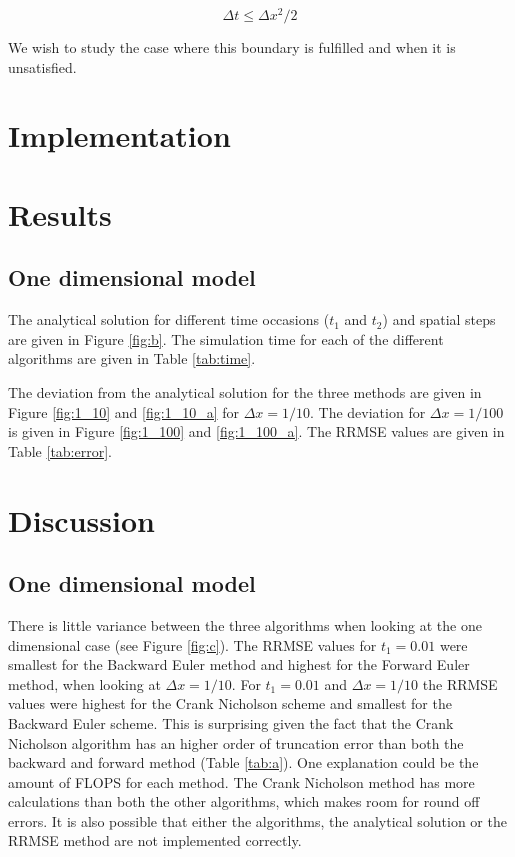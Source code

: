 \documentclass{article}
\begin{document}
\begin{multicols}{2}
\begin{equation}
\Delta t \leq \Delta x^2/2
\end{equation}

We wish to study the case where this boundary is fulfilled and when it is unsatisfied. 

\section{Implementation}


\section{Results}

\subsection{One dimensional model}

The analytical solution for different time occasions ($t_1$ and $t_2$) and spatial steps are given in Figure \ref{fig:b}. The simulation time for each of the different algorithms are given in Table \ref{tab:time}.

The deviation from the analytical solution for the three methods are given in Figure \ref{fig:1_10} and \ref{fig:1_10_a} for $\Delta x = 1/10$. The deviation for $\Delta x = 1/100$ is given in Figure \ref{fig:1_100} and \ref{fig:1_100_a}. The RRMSE values are given in Table \ref{tab:error}.

\section{Discussion}

\subsection{One dimensional model}

There is little variance between the three algorithms when looking at the one dimensional case (see Figure \ref{fig:c}). The RRMSE values for $t_1=0.01$ were smallest for the Backward Euler method and highest for the Forward Euler method, when looking at $\Delta x = 1/10$. For $t_1=0.01$ and $\Delta x = 1/10$ the RRMSE values were highest for the Crank Nicholson scheme and smallest for the Backward Euler scheme. This is surprising given the fact that the Crank Nicholson algorithm has an higher order of truncation error than both the backward and forward method (Table \ref{tab:a}). One explanation could be the amount of FLOPS for each method. The Crank Nicholson method has more calculations than both the other algorithms, which makes room for round off errors. It is also possible that either the algorithms, the analytical solution or the RRMSE method are not implemented correctly. 


\end{multicols}
\end{document}
